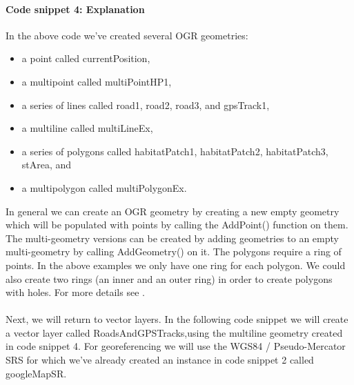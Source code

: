 \documentclass {article}
\begin{document}
\paragraph{ Code snippet 4: Explanation}
In the above code we've created several OGR geometries: 
\begin {itemize} 
\item a point called currentPosition,
\item  a multipoint called multiPointHP1, 
\item a series of lines called road1, road2, road3, and gpsTrack1, 
\item a multiline called multiLineEx,
\item  a series of polygons called habitatPatch1, habitatPatch2, habitatPatch3, stArea, and
\item  a multipolygon called multiPolygonEx.
\end{itemize}
In general we can create an OGR geometry by creating a new empty geometry which will be populated with points by calling the AddPoint() function on them. The multi-geometry versions can be created by adding geometries to an empty multi-geometry by calling AddGeometry() on it. The polygons require a ring of points. In the above examples we only have one ring for each polygon. We could also create two rings (an inner and an outer ring) in order to create polygons with holes. For more details see \cite{garrard_geoprocessing_2016}.  
\\
\\
Next, we will return to vector layers. In the following code snippet we will create a vector layer called RoadsAndGPSTracks,using the multiline geometry created in code snippet 4.
 For georeferencing we will use the WGS84 / Pseudo-Mercator SRS for which we've already created an instance in code snippet 2 called googleMapSR. 
\end{document}
